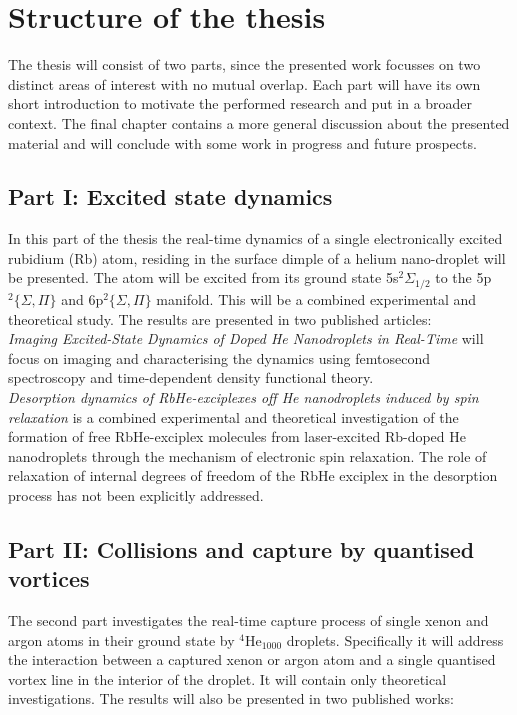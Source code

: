 \documentclass[11pt,a4paper,twoside]{article}
\begin{document}
	\section{Structure of the thesis}
		The thesis will consist of two parts, since the presented work focusses on two distinct areas of interest with no mutual overlap. Each part will have its own short introduction to motivate the performed research and put in a broader context. The final chapter contains a more general discussion about the presented material and will conclude with some work in progress and future prospects.

		\subsection{Part I: Excited state dynamics}
			In this part of the thesis the real-time dynamics of a single electronically excited rubidium (Rb) atom, residing in the surface dimple of a helium nano-droplet will be presented. The atom will be excited from its ground state 5s$^2\Sigma_{1/2}$ to the 5p$^2\{\Sigma,\Pi\}$ and 6p$^2\{\Sigma,\Pi\}$ manifold. This will be a combined experimental and theoretical study. The results are presented in two published articles:\\
		
			\emph{Imaging Excited-State Dynamics of Doped He Nanodroplets in Real-Time} will focus on imaging and characterising the dynamics using femtosecond spectroscopy and  time-dependent density functional theory.\\
		
			\emph{Desorption dynamics of RbHe-exciplexes off He nanodroplets induced by spin relaxation} is a combined experimental and theoretical investigation of the formation of free RbHe-exciplex molecules from laser-excited Rb-doped He nanodroplets through the mechanism of electronic spin relaxation. The role of relaxation of internal degrees of freedom of the RbHe exciplex in the desorption process has not been explicitly addressed.

		\subsection{Part II: Collisions and capture by quantised vortices}
			The second part investigates the real-time capture process of single xenon and argon atoms in their ground state by $^4$He$_{1000}$ droplets. Specifically it will address the interaction between a captured xenon or argon atom and a single quantised vortex line in the interior of the droplet. It will contain only theoretical investigations. The results will also be presented in two published works:\\
		
\end{document}
